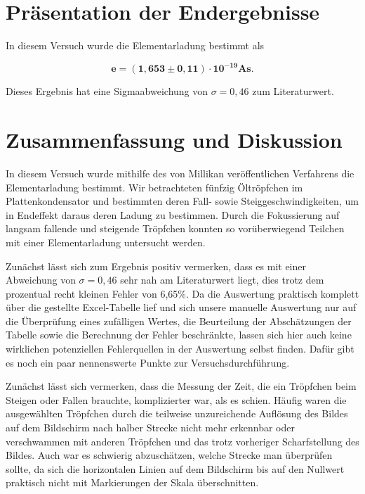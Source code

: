 \documentclass{article}
\begin{document}
\newpage
\section{Präsentation der Endergebnisse}

In diesem Versuch wurde die Elementarladung bestimmt als 

\begin{equation}
    \bm{e} = \bm{(1,653 \pm 0,11) \cdot 10^{-19}} \textbf{As}.
\end{equation}

Dieses Ergebnis hat eine Sigmaabweichung von $\sigma = 0,46$ zum Literaturwert.

\newpage
\section{Zusammenfassung und Diskussion}

In diesem Versuch wurde mithilfe des von Millikan veröffentlichen Verfahrens die Elementarladung bestimmt. Wir betrachteten fünfzig Öltröpfchen im Plattenkondensator und bestimmten deren Fall- sowie Steiggeschwindigkeiten, um in Endeffekt daraus deren Ladung zu bestimmen. Durch die Fokussierung auf langsam fallende und steigende Tröpfchen konnten so vorüberwiegend Teilchen mit einer Elementarladung untersucht werden.

Zunächst lässt sich zum Ergebnis positiv vermerken, dass es mit einer Abweichung von $\sigma = 0,46$ sehr nah am Literaturwert liegt, dies trotz dem prozentual recht kleinen Fehler von 6,65\%. Da die Auswertung praktisch komplett über die gestellte Excel-Tabelle lief und sich unsere manuelle Auswertung nur auf die Überprüfung eines zufälligen Wertes, die Beurteilung der Abschätzungen der Tabelle sowie die Berechnung der Fehler beschränkte, lassen sich hier auch keine wirklichen potenziellen Fehlerquellen in der Auswertung selbst finden. Dafür gibt es noch ein paar nennenswerte Punkte zur Versuchsdurchführung.

Zunächst lässt sich vermerken, dass die Messung der Zeit, die ein Tröpfchen beim Steigen oder Fallen brauchte, komplizierter war, als es schien. Häufig waren die ausgewählten Tröpfchen durch die teilweise unzureichende Auflösung des Bildes auf dem Bildschirm nach halber Strecke nicht mehr erkennbar oder verschwammen mit anderen Tröpfchen und das trotz vorheriger Scharfstellung des Bildes. Auch war es schwierig abzuschätzen, welche Strecke man überprüfen sollte, da sich die horizontalen Linien auf dem Bildschirm bis auf den Nullwert praktisch nicht mit Markierungen der Skala überschnitten.
\end{document}

